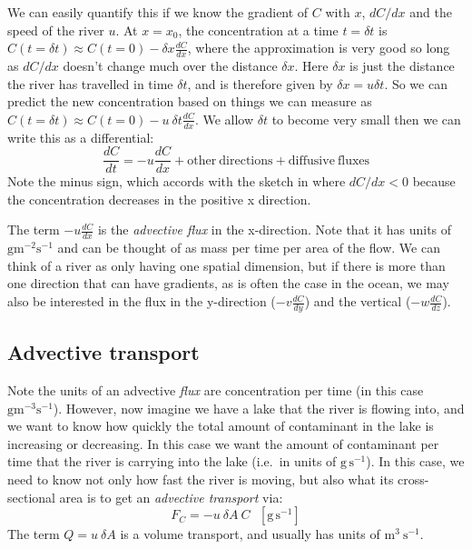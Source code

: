 We can easily quantify this if we know the gradient of $C$ with $x$, $dC/dx$ and the speed of the river $u$.  At $x=x_0$, the concentration at a time $t=\delta t$ is
$C(t=\delta t) \approx C(t=0) - \delta x \frac{dC}{dx}$, where the approximation is very good so long as $dC/dx$ doesn't change much over the distance $\delta x$.  Here $\delta x$ is just the distance the river has travelled in time $\delta t$, and is therefore given by $\delta x = u \delta t$.  So we can predict the new concentration based on things we can measure as  $C(t=\delta t) \approx C(t=0) - u\ \delta t \frac{dC}{dx}$.  We allow $\delta t$ to become very small then we can write this as a differential:
\begin{equation}
\frac{dC}{dt} = -u \frac{dC}{dx} + \mathrm{other\ directions} + \mathrm{diffusive\ fluxes}    
\end{equation}
Note the minus sign, which accords with the sketch in  where $dC/dx < 0$ because the concentration decreases in the positive x direction.  

The term $-u\frac{dC}{dx}$ is the \emph{advective flux} in the x-direction.  Note that it has units of $\mathrm{g m^{-2}s^{-1}}$ and can be thought of as mass per time per area of the flow.   We can think of a river as only having one spatial dimension, but if there is more than one direction that can have gradients, as is often the case in the ocean, we may also be interested in the flux in the y-direction ($-v\frac{dC}{dy}$) and the vertical ($-w\frac{dC}{dz}$).  

\subsection{Advective transport} 

Note the units of an advective \emph{flux} are concentration per time (in this case $\mathrm{g m^{-3} s^{-1}}$).  However, now imagine we have a lake that the river is flowing into, and we want to know how quickly the total amount of contaminant in the lake is increasing or decreasing.  In this case we want the amount of contaminant per time that the river is carrying into the lake (i.e.\ in units of $\mathrm{g\, s^{-1}}$). In this case, we need to know not only how fast the river is moving, but also what its cross-sectional area is to get an \emph{advective transport} via:
\begin{equation}
    F_C = -u\ \delta A\ C \ \ \ \mathrm{[g\,s^{-1}]}
\end{equation} 
The term $Q = u\ \delta A$ is a volume transport, and usually has units of $\mathrm{ m^3\ s^{-1}}$.  

